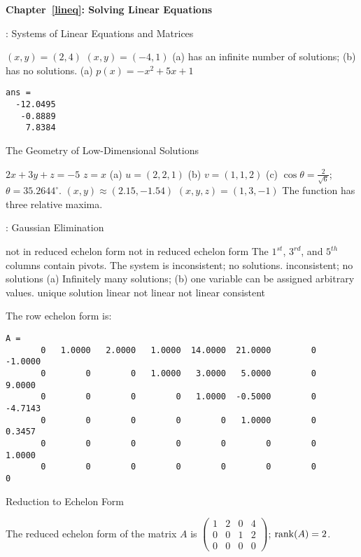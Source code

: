 \vspace{0.08in}
{\bf Chapter~\ref{lineq}: Solving Linear Equations}

: Systems of Linear Equations and Matrices

 \ans $(x,y) = (2,4)$
 \ans $(x,y) = (-4,1)$
\ans (a) has an infinite number of solutions; (b) has no solutions.
(a) \ans $p(x) = -x^2 + 5x + 1$
 \ans 
\begin{verbatim}
ans =
  -12.0495
   -0.8889
    7.8384
\end{verbatim}


 The Geometry of Low-Dimensional Solutions

 \ans $2x + 3y + z = -5$
 \ans $z = x$
(a) $u = (2,2,1)$
(b) $v = (1,1,2)$
(c) $\cos\theta = \frac{2}{\sqrt{6}}$; $\theta = 35.2644^\circ$.
 \ans $(x,y) \approx (2.15,-1.54)$
 \ans $(x,y,z) = (1,3,-1)$
 \ans The function has three relative maxima.


: Gaussian Elimination

 not in reduced echelon form
 not in reduced echelon form
 The $1^{st}$, $3^{rd}$, and $5^{th}$ columns contain pivots. 
The system is inconsistent; no solutions.
 inconsistent; no solutions
 \ans (a) Infinitely many solutions; (b) one variable 
can be assigned arbitrary values.
 \ans unique solution
 \ans linear
 \ans not linear
 \ans not linear
  \ans consistent

 \ans The row echelon form is:
\begin{verbatim}
A = 
       0   1.0000   2.0000   1.0000  14.0000  21.0000        0  -1.0000
       0        0        0   1.0000   3.0000   5.0000        0   9.0000
       0        0        0        0   1.0000  -0.5000        0  -4.7143
       0        0        0        0        0   1.0000        0   0.3457
       0        0        0        0        0        0        0   1.0000
       0        0        0        0        0        0        0        0
\end{verbatim}


 Reduction to Echelon Form

The reduced echelon form of the matrix $A$ is
$\left(\begin{array}{rrrr} 1 & 2 & 0 & 4 \\ 0 & 0 & 1 & 2 \\ 0 & 0 & 0
& 0\end{array}\right)$; ${\rm rank}(A)=2$. 

